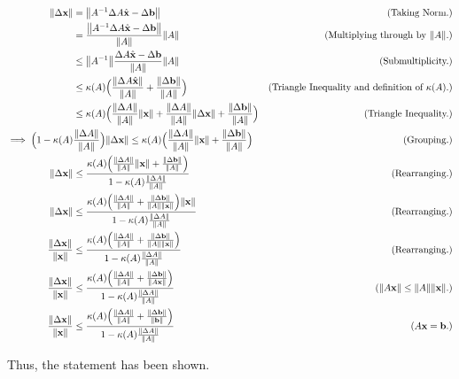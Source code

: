 \begin{solution}
    \alignbreak
    \begin{align}
        \norm{\Delta \textbf{x}} &= \norm{A^{-1}\Delta A \hat{\textbf{x}} - \Delta \textbf{b}} &\text{(Taking Norm.)}\nonumber\\
        &= \frac{\norm{A^{-1}\Delta A \hat{\textbf{x}} - \Delta \textbf{b}}}{\norm{A}} \norm{A} &\text{(Multiplying through by $\norm{A}$.)}\nonumber\\
        &\leq \norm{A^{-1}} \frac{\Delta A \hat{\textbf{x}} - \Delta \textbf{b}}{\norm{A}}\norm{A} &\text{(Submultiplicity.)}\nonumber\\
        &\leq \kappa(A)\Big( \frac{\norm{\Delta A \hat{\textbf{x}}}}{\norm{A}} + \frac{\norm{\Delta \textbf{b}}}{\norm{A}}\Big) &\text{(Triangle Inequality and definition of $\kappa(A).$)}\nonumber\\
        &\leq \kappa(A)\Big( \frac{\norm{\Delta A}}{\norm{A}}\norm{\textbf{x}} + \frac{\norm{\Delta A}}{\norm{A}}\norm{\Delta \textbf{x}} + \frac{\norm{\Delta \textbf{b}}}{\norm{A}}\Big) &\text{(Triangle Inequality.)}\nonumber\\
        \implies \Big(1 - \kappa(A) &\frac{\norm{\Delta A}}{\norm{A}}\Big)\norm{\Delta \textbf{x}} \leq \kappa(A)\Big( \frac{\norm{\Delta A}}{\norm{A}} \norm{\textbf{x}} + \frac{\norm{\Delta \textbf{b}}}{\norm{A}}\Big) &\text{(Grouping.)}\nonumber\\
        \norm{\Delta \textbf{x}} &\leq \frac{\kappa(A)\Big( \frac{\norm{\Delta A}}{\norm{A}} \norm{\textbf{x}} + \frac{\norm{\Delta \textbf{b}}}{\norm{A}}\Big)}{1 - \kappa(A) \frac{\norm{\Delta A}}{\norm{A}}} &\text{(Rearranging.)}\nonumber\\
        \norm{\Delta \textbf{x}} &\leq \frac{\kappa(A)\Big( \frac{\norm{\Delta A}}{\norm{A}} + \frac{\norm{\Delta \textbf{b}}}{\norm{A}\norm{\textbf{x}}}\Big)\norm{\textbf{x}}}{1 - \kappa(A) \frac{\norm{\Delta A}}{\norm{A}}} &\text{(Rearranging.)}\nonumber\\
        \frac{\norm{\Delta \textbf{x}}}{\norm{\textbf{x}}} &\leq \frac{\kappa(A)\Big( \frac{\norm{\Delta A}}{\norm{A}} + \frac{\norm{\Delta \textbf{b}}}{\norm{A}\norm{\textbf{x}}}\Big)}{1 - \kappa(A) \frac{\norm{\Delta A}}{\norm{A}}} &\text{(Rearranging.)}\nonumber\\
        \frac{\norm{\Delta \textbf{x}}}{\norm{\textbf{x}}} &\leq \frac{\kappa(A)\Big( \frac{\norm{\Delta A}}{\norm{A}} + \frac{\norm{\Delta \textbf{b}}}{\norm{A\textbf{x}}}\Big)}{1 - \kappa(A) \frac{\norm{\Delta A}}{\norm{A}}} &\text{($\norm{A\textbf{x}} \leq \norm{A}\norm{\textbf{x}}$.)}\nonumber\\
        \frac{\norm{\Delta \textbf{x}}}{\norm{\textbf{x}}} &\leq \frac{\kappa(A)\Big( \frac{\norm{\Delta A}}{\norm{A}} + \frac{\norm{\Delta \textbf{b}}}{\norm{\textbf{b}}}\Big)}{1 - \kappa(A) \frac{\norm{\Delta A}}{\norm{A}}} &\text{($A\textbf{x} = \textbf{b}$.)}\nonumber
    \end{align}
    \alignbreak

    Thus, the statement has been shown.
\end{solution}
